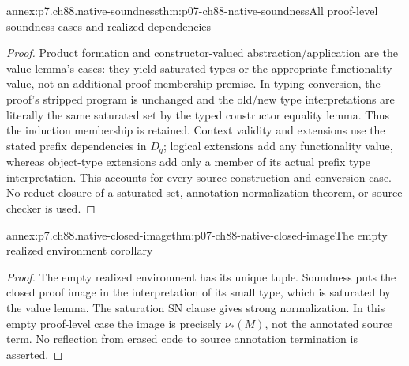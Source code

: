 \begin{annexitem}{annex:p7.ch88.native-soundness}{thm:p07-ch88-native-soundness}{All proof-level soundness cases and realized dependencies}
\begin{proof}
Product formation and constructor-valued abstraction/application are the
value lemma's cases: they yield saturated types or the appropriate
functionality value, not an additional proof membership premise. In
typing conversion, the proof's stripped program is unchanged and the
old/new type interpretations are literally the same saturated set by
the typed constructor equality lemma. Thus the induction membership
is retained. Context validity and extensions use the stated prefix
dependencies in \(D_q\); logical extensions add any functionality
value, whereas object-type extensions add only a member of its actual
prefix type interpretation. This accounts for every source construction
and conversion case. No reduct-closure of a saturated set, annotation
normalization theorem, or source checker is used.
\end{proof}
\end{annexitem}

\begin{annexitem}{annex:p7.ch88.native-closed-image}{thm:p07-ch88-native-closed-image}{The empty realized environment corollary}
\begin{proof}
The empty realized environment has its unique tuple. Soundness puts
the closed proof image in the interpretation of its small type, which
is saturated by the value lemma. The saturation SN clause gives strong
normalization. In this empty proof-level case the image is precisely
\(\nu_\ast(M)\), not the annotated source term. No reflection from
erased code to source annotation termination is asserted.
\end{proof}
\end{annexitem}

